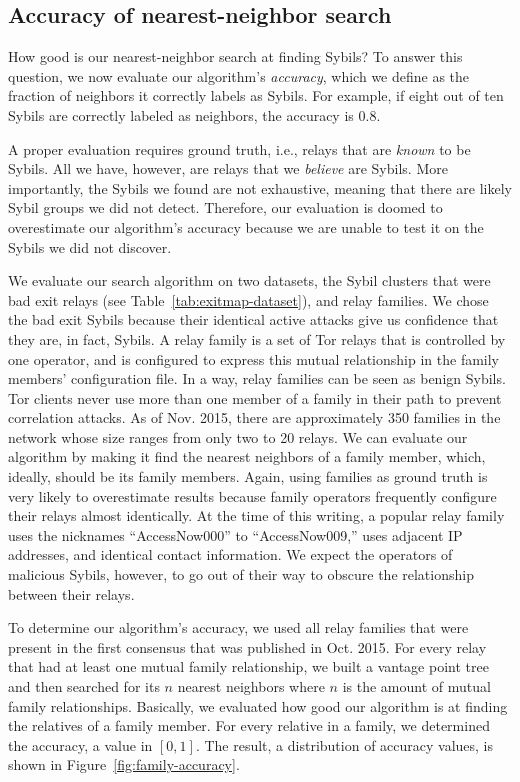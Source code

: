 \subsection{Accuracy of nearest-neighbor search}
\label{sec:accuracy}
How good is our nearest-neighbor search at finding Sybils?  To answer this
question, we now evaluate our algorithm's \emph{accuracy}, which we define as
the fraction of neighbors it correctly labels as Sybils.  For example, if eight
out of ten Sybils are correctly labeled as neighbors, the accuracy is 0.8.

A proper evaluation requires ground truth, i.e., relays that are \emph{known} to
be Sybils.  All we have, however, are relays that we \emph{believe} are Sybils.
More importantly, the Sybils we found are not exhaustive, meaning that there are
likely Sybil groups we did not detect.  Therefore, our evaluation is doomed to
overestimate our algorithm's accuracy because we are unable to test it on the
Sybils we did not discover.

We evaluate our search algorithm on two datasets, the Sybil clusters that were
bad exit relays (see Table~\ref{tab:exitmap-dataset}), and relay families.  We
chose the bad exit Sybils because their identical active attacks give us
confidence that they are, in fact, Sybils.  A relay family is a set of Tor
relays that is controlled by one operator, and is configured to express this
mutual relationship in the family members' configuration file.  In a way, relay
families can be seen as benign Sybils.  Tor clients never use more than one
member of a family in their path to prevent correlation attacks.  As of Nov.
2015, there are approximately 350 families in the network whose size ranges from
only two to 20 relays.  We can evaluate our algorithm by making it find the
nearest neighbors of a family member, which, ideally, should be its family
members.  Again, using families as ground truth is very likely to overestimate
results because family operators frequently configure their relays almost
identically.  At the time of this writing, a popular relay family uses the
nicknames ``AccessNow000'' to ``AccessNow009,'' uses adjacent IP addresses, and
identical contact information.  We expect the operators of malicious Sybils,
however, to go out of their way to obscure the relationship between their
relays.

To determine our algorithm's accuracy, we used all relay families that were
present in the first consensus that was published in Oct. 2015.  For every relay
that had at least one mutual family relationship, we built a vantage point tree and then
searched for its $n$ nearest neighbors where $n$ is the amount of mutual family
relationships.  Basically, we evaluated how good our algorithm is at finding the
relatives of a family member.  For every relative in a family, we determined the
accuracy, a value in $[0,1]$.  The result, a distribution of accuracy values, is
shown in Figure~\ref{fig:family-accuracy}.

